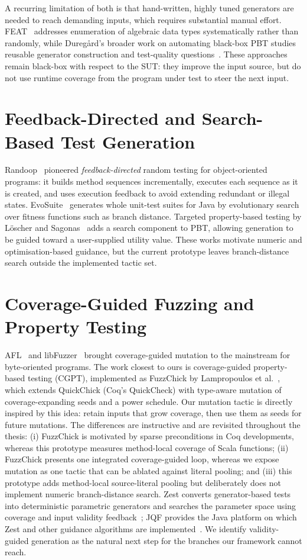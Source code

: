 \documentclass[11pt,a4paper]{report}
\begin{document}
A recurring limitation of both is that hand-written, highly tuned generators are needed to reach demanding
inputs, which requires substantial manual effort. FEAT~\cite{duregard2012} addresses enumeration of
algebraic data types systematically rather than randomly, while Dureg\aa rd's broader work on automating
black-box PBT studies reusable generator construction and test-quality questions~\cite{duregard2016}. These
approaches remain black-box with respect to the SUT: they improve the input source, but do not use runtime
coverage from the program under test to steer the next input.

\section{Feedback-Directed and Search-Based Test Generation}

Randoop~\cite{pacheco2007} pioneered \emph{feedback-directed} random testing for object-oriented programs:
it builds method sequences incrementally, executes each sequence as it is created, and uses execution
feedback to avoid extending redundant or illegal states. EvoSuite~\cite{fraser2011} generates whole
unit-test suites for Java by evolutionary search over fitness functions such as branch distance. Targeted
property-based testing by L\"oscher and Sagonas~\cite{loscher2017} adds a search component to PBT, allowing
generation to be guided toward a user-supplied utility value. These works motivate numeric and
optimisation-based guidance, but the current prototype leaves branch-distance search outside the implemented
tactic set.

\section{Coverage-Guided Fuzzing and Property Testing}

AFL~\cite{afl} and libFuzzer~\cite{libfuzzer} brought coverage-guided mutation to the mainstream for
byte-oriented programs. The work closest to ours is coverage-guided property-based testing (CGPT),
implemented as FuzzChick by Lampropoulos et al.~\cite{lampropoulos2019}, which extends QuickChick (Coq's
QuickCheck) with type-aware mutation of coverage-expanding seeds and a power schedule. Our mutation tactic
is directly inspired by this idea: retain inputs that grow coverage, then use them as seeds for future
mutations. The differences are instructive and are revisited throughout the thesis: (i) FuzzChick is
motivated by sparse preconditions in Coq developments, whereas this prototype measures method-local coverage
of Scala functions; (ii) FuzzChick presents one integrated coverage-guided loop, whereas we expose mutation
as one tactic that can be ablated against literal pooling; and (iii) this prototype adds method-local
source-literal pooling but deliberately does not implement numeric branch-distance search. Zest
converts generator-based tests into deterministic parametric generators and searches the parameter space
using coverage and input validity feedback~\cite{padhye2019zest}; JQF provides the Java platform on which
Zest and other guidance algorithms are implemented~\cite{padhye2019jqf}. We identify validity-guided
generation as the natural next step for the branches our framework cannot reach.
\end{document}
